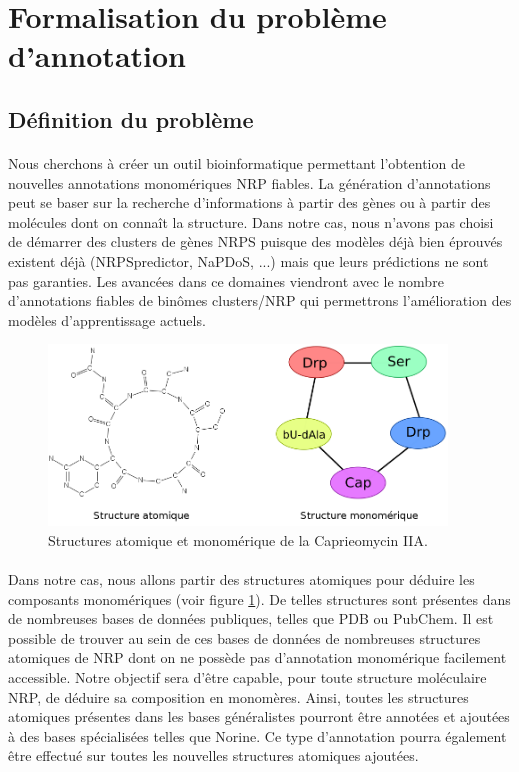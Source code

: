 \documentclass[12pt,french,twoside]{report}
\begin{document}
\section{Formalisation du problème d'annotation}

\subsection{Définition du problème}

\paragraph{}Nous cherchons à créer un outil bioinformatique permettant l'obtention de nouvelles annotations monomériques NRP fiables.
La génération d'annotations peut se baser sur la recherche d'informations à partir des gènes ou à partir des molécules dont on connaît la structure.
Dans notre cas, nous n'avons pas choisi de démarrer des clusters de gènes NRPS puisque des modèles déjà bien éprouvés existent déjà (NRPSpredictor, NaPDoS, ...) mais que leurs prédictions ne sont pas garanties.
Les avancées dans ce domaines viendront avec le nombre d'annotations fiables de binômes clusters/NRP qui permettrons l'amélioration des modèles d'apprentissage actuels.

\begin{figure}[!ht]
  \begin{center}
    \includegraphics[width=400px]{Figures/s2m/Intro/structures.png}
    \caption{\label{structures}Structures atomique et monomérique de la Caprieomycin IIA.}
  \end{center}
\end{figure}

\paragraph{}Dans notre cas, nous allons partir des structures atomiques pour déduire les composants monomériques (voir figure \ref{structures}).
De telles structures sont présentes dans de nombreuses bases de données publiques, telles que PDB ou PubChem.
Il est possible de trouver au sein de ces bases de données de nombreuses structures atomiques de NRP dont on ne possède pas d'annotation monomérique facilement accessible.
Notre objectif sera d'être capable, pour toute structure moléculaire NRP, de déduire sa composition en monomères.
Ainsi, toutes les structures atomiques présentes dans les bases généralistes pourront être annotées et ajoutées à des bases spécialisées telles que Norine.
Ce type d'annotation pourra également être effectué sur toutes les nouvelles structures atomiques ajoutées.
\end{document}
